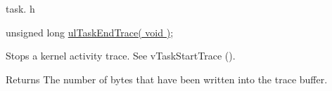 task. h 
\begin{DoxyPre}unsigned long \hyperlink{win32_2win32_2_libraries_2_free_r_t_o_s_2_source_2tasks_8c_a59cf8384f92bc0f47939548c24fcc032}{ulTaskEndTrace( void )};\end{DoxyPre}


Stops a kernel activity trace. See v\-Task\-Start\-Trace ().

\begin{DoxyReturn}{Returns}
The number of bytes that have been written into the trace buffer. 
\end{DoxyReturn}
